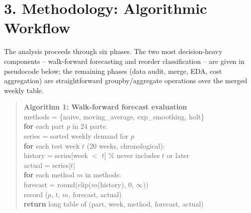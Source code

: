 \documentclass[12pt]{article}
\begin{document}
\section*{3. Methodology: Algorithmic Workflow}

The analysis proceeds through six phases. The two most decision-heavy components --
walk-forward forecasting and reorder classification -- are given in pseudocode below; the
remaining phases (data audit, merge, EDA, cost aggregation) are straightforward
groupby/aggregate operations over the merged weekly table.

\begin{quote}
\small\ttfamily\noindent
\textbf{Algorithm 1: Walk-forward forecast evaluation}\\[0.3em]
methods = \{naive, moving\_average, exp\_smoothing, holt\}\\
\textbf{for} each part $p$ in 24 parts:\\
\hspace*{1.5em}series = sorted weekly demand for $p$\\
\hspace*{1.5em}\textbf{for} each test week $t$ (20 weeks, chronological):\\
\hspace*{3em}history = series[week $<$ $t$] \quad\% never includes $t$ or later\\
\hspace*{3em}actual = series[$t$]\\
\hspace*{3em}\textbf{for} each method $m$ in methods:\\
\hspace*{4.5em}forecast = round(clip($m$(history), 0, $\infty$))\\
\hspace*{4.5em}record ($p$, $t$, $m$, forecast, actual)\\
\textbf{return} long table of (part, week, method, forecast, actual)
\end{quote}
\end{document}
